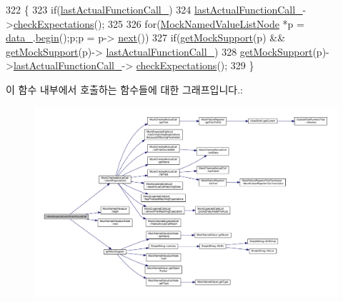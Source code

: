 \begin{DoxyCode}
322 \{
323     \textcolor{keywordflow}{if}(\hyperlink{class_mock_support_aadd48976efe51d36597ebe298e6b9233}{lastActualFunctionCall\_})
324         \hyperlink{class_mock_support_aadd48976efe51d36597ebe298e6b9233}{lastActualFunctionCall\_}->\hyperlink{class_mock_checked_actual_call_aaf94db2d926ab0a1cae9fc65c7eec54c}{checkExpectations}();
325 
326     \textcolor{keywordflow}{for}(\hyperlink{class_mock_named_value_list_node}{MockNamedValueListNode} *p = \hyperlink{class_mock_support_a26b06d2d43a7804c9aa5808409c0c1ee}{data\_}.\hyperlink{class_mock_named_value_list_a4a5976d05542385eb64ea73eee7fc59c}{begin}();p;p = p->
      \hyperlink{class_mock_named_value_list_node_adaf0ca3232d35f7efae1bade86b8027e}{next}())
327         \textcolor{keywordflow}{if}(\hyperlink{class_mock_support_a575951d416e49f54fd1a3fc4823609e3}{getMockSupport}(p) && \hyperlink{class_mock_support_a575951d416e49f54fd1a3fc4823609e3}{getMockSupport}(p)->
      \hyperlink{class_mock_support_aadd48976efe51d36597ebe298e6b9233}{lastActualFunctionCall\_})
328             \hyperlink{class_mock_support_a575951d416e49f54fd1a3fc4823609e3}{getMockSupport}(p)->\hyperlink{class_mock_support_aadd48976efe51d36597ebe298e6b9233}{lastActualFunctionCall\_}->
      \hyperlink{class_mock_checked_actual_call_aaf94db2d926ab0a1cae9fc65c7eec54c}{checkExpectations}();
329 \}
\end{DoxyCode}


이 함수 내부에서 호출하는 함수들에 대한 그래프입니다.\+:
\nopagebreak
\begin{figure}[H]
\begin{center}
\leavevmode
\includegraphics[width=350pt]{class_mock_support_a74d9a767d0ce83fb496ce64be8cf2851_cgraph}
\end{center}
\end{figure}




